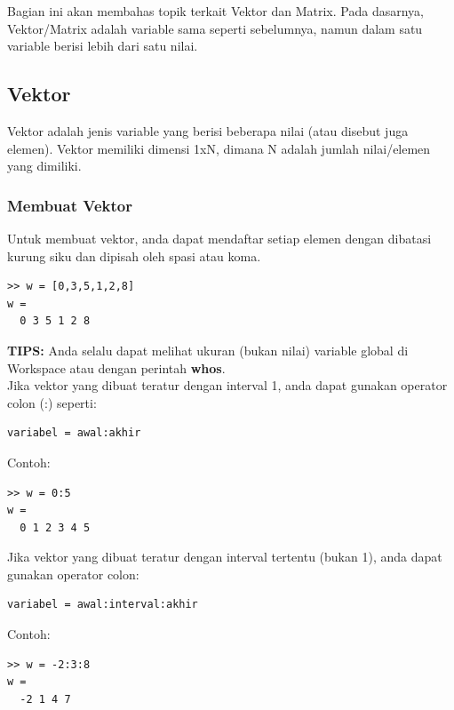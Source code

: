 \documentclass[12pt]{book}
\begin{document}
	Bagian ini akan membahas topik terkait Vektor dan Matrix.
	Pada dasarnya, Vektor/Matrix adalah variable sama seperti sebelumnya,
	namun dalam satu variable berisi lebih dari satu nilai.
	
	\subsection{Vektor}
	
	Vektor adalah jenis variable yang berisi beberapa nilai (atau disebut juga elemen).
	Vektor memiliki dimensi 1xN, dimana N adalah jumlah nilai/elemen yang dimiliki.
	
	\subsubsection{Membuat Vektor}
		
	Untuk membuat vektor, anda dapat mendaftar setiap elemen dengan dibatasi kurung siku dan dipisah oleh spasi atau koma.
	\begin{verbatim}
>> w = [0,3,5,1,2,8]
w = 
  0 3 5 1 2 8
	\end{verbatim}

	\textbf{TIPS:} Anda selalu dapat melihat ukuran (bukan nilai) variable global di Workspace atau dengan perintah \textbf{whos}.\\
	
	\newpage
	Jika vektor yang dibuat teratur dengan interval 1, anda dapat gunakan operator colon (:) seperti:
	\begin{verbatim}
variabel = awal:akhir
	\end{verbatim}

	Contoh:
	\begin{verbatim}
>> w = 0:5
w = 
  0 1 2 3 4 5
	\end{verbatim}

	Jika vektor yang dibuat teratur dengan interval tertentu (bukan 1), anda dapat gunakan operator colon:
	\begin{verbatim}
variabel = awal:interval:akhir
	\end{verbatim}

	Contoh:
	\begin{verbatim}
>> w = -2:3:8
w = 
  -2 1 4 7
	\end{verbatim}
\end{document}
